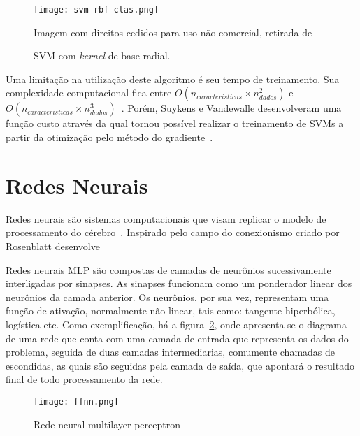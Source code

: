 \begin{figure}
\begin{center} {
    \begin{center}
    \texttt{[image: svm-rbf-clas.png]}
    \caption{SVM com \textit{kernel} de base radial.}
    \small Imagem com direitos cedidos para uso não comercial, retirada de~\cite{vanderplas15}
    \label{fig:svm-rbf-clas}
    \end{center}
}
\end{center}
\end{figure}

Uma limitação na utilização deste algoritmo é seu tempo de treinamento. Sua complexidade computacional fica entre $O(n_{caracteristicas} \times n_{dados}^2)$ e $O(n_{caracteristicas} \times n_{dados}^3)$~\cite{list09}. Porém, Suykens e Vandewalle desenvolveram uma função custo através da qual tornou possível realizar o treinamento de SVMs a partir da otimização pelo método do gradiente~\cite{suykens99}.

\section{Redes Neurais} \label{sec:nn}

Redes neurais são sistemas computacionais que visam replicar o modelo de processamento do cérebro~\cite{wiener61}. Inspirado pelo campo do conexionismo criado por  Rosenblatt \cite{rosenblatt58} desenvolve%

Redes neurais MLP são compostas de camadas de neurônios sucessivamente interligadas por sinapses. As sinapses funcionam como um ponderador linear dos neurônios da camada anterior. Os neurônios, por sua vez, representam uma função de ativação, normalmente não linear, tais como: tangente hiperbólica, logística etc. Como exemplificação, há a figura~\ref{fig:ff-neural-net}, onde apresenta-se o diagrama de uma rede que conta com uma camada de entrada que representa os dados do problema, seguida de duas camadas intermediarias, comumente chamadas de escondidas, as quais são seguidas pela camada de saída, que apontará o resultado final de todo processamento da rede.

\begin{figure}
\begin{center} {
    \begin{center}
    \texttt{[image: ffnn.png]}
    \caption{Rede neural multilayer perceptron}
    \label{fig:ff-neural-net}
    \end{center}
}
\end{center}
\end{figure}

